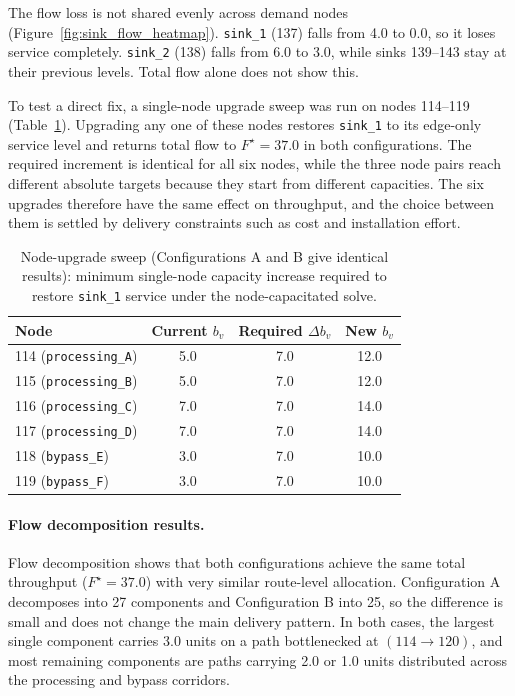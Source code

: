\documentclass[12pt]{report}
\begin{document}
The flow loss is not shared evenly across demand nodes (Figure~\ref{fig:sink_flow_heatmap}). \texttt{sink\_1} (137) falls from 4.0 to 0.0, so it loses service completely. \texttt{sink\_2} (138) falls from 6.0 to 3.0, while sinks 139--143 stay at their previous levels. Total flow alone does not show this.

To test a direct fix, a single-node upgrade sweep was run on nodes 114--119 (Table~\ref{tab:node_upgrade_sweep}). Upgrading any one of these nodes restores \texttt{sink\_1} to its edge-only service level and returns total flow to $F^\star=37.0$ in both configurations. The required increment is identical for all six nodes, while the three node pairs reach different absolute targets because they start from different capacities. The six upgrades therefore have the same effect on throughput, and the choice between them is settled by delivery constraints such as cost and installation effort.

\begin{table}[htbp]
\centering
\caption{Node-upgrade sweep (Configurations A and B give identical results): minimum single-node capacity increase required to restore \texttt{sink\_1} service under the node-capacitated solve.}
\label{tab:node_upgrade_sweep}
\begin{tabular}{lccc}
\toprule
Node & Current $b_v$ & Required $\Delta b_v$ & New $b_v$ \\
\midrule
114 (\texttt{processing\_A}) & 5.0 & 7.0 & 12.0 \\
115 (\texttt{processing\_B}) & 5.0 & 7.0 & 12.0 \\
116 (\texttt{processing\_C}) & 7.0 & 7.0 & 14.0 \\
117 (\texttt{processing\_D}) & 7.0 & 7.0 & 14.0 \\
118 (\texttt{bypass\_E})     & 3.0 & 7.0 & 10.0 \\
119 (\texttt{bypass\_F})     & 3.0 & 7.0 & 10.0 \\
\bottomrule
\end{tabular}
\end{table}

\paragraph{Flow decomposition results.}

Flow decomposition shows that both configurations achieve the same total throughput ($F^\star=37.0$) with very similar route-level allocation. Configuration A decomposes into 27 components and Configuration B into 25, so the difference is small and does not change the main delivery pattern. In both cases, the largest single component carries 3.0 units on a path bottlenecked at $(114\to120)$, and most remaining components are paths carrying 2.0 or 1.0 units distributed across the processing and bypass corridors.
\end{document}
